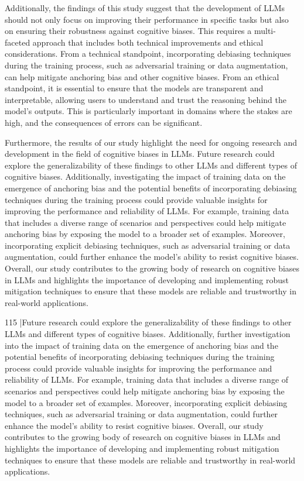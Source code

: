 \documentclass{article}
\begin{document}
Additionally, the findings of this study suggest that the development of LLMs should not only focus on improving their performance in specific tasks but also on ensuring their robustness against cognitive biases. This requires a multi-faceted approach that includes both technical improvements and ethical considerations. From a technical standpoint, incorporating debiasing techniques during the training process, such as adversarial training or data augmentation, can help mitigate anchoring bias and other cognitive biases. From an ethical standpoint, it is essential to ensure that the models are transparent and interpretable, allowing users to understand and trust the reasoning behind the model's outputs. This is particularly important in domains where the stakes are high, and the consequences of errors can be significant.

Furthermore, the results of our study highlight the need for ongoing research and development in the field of cognitive biases in LLMs. Future research could explore the generalizability of these findings to other LLMs and different types of cognitive biases. Additionally, investigating the impact of training data on the emergence of anchoring bias and the potential benefits of incorporating debiasing techniques during the training process could provide valuable insights for improving the performance and reliability of LLMs. For example, training data that includes a diverse range of scenarios and perspectives could help mitigate anchoring bias by exposing the model to a broader set of examples. Moreover, incorporating explicit debiasing techniques, such as adversarial training or data augmentation, could further enhance the model's ability to resist cognitive biases. Overall, our study contributes to the growing body of research on cognitive biases in LLMs and highlights the importance of developing and implementing robust mitigation techniques to ensure that these models are reliable and trustworthy in real-world applications.

115 |Future research could explore the generalizability of these findings to other LLMs and different types of cognitive biases. Additionally, further investigation into the impact of training data on the emergence of anchoring bias and the potential benefits of incorporating debiasing techniques during the training process could provide valuable insights for improving the performance and reliability of LLMs. For example, training data that includes a diverse range of scenarios and perspectives could help mitigate anchoring bias by exposing the model to a broader set of examples. Moreover, incorporating explicit debiasing techniques, such as adversarial training or data augmentation, could further enhance the model's ability to resist cognitive biases. Overall, our study contributes to the growing body of research on cognitive biases in LLMs and highlights the importance of developing and implementing robust mitigation techniques to ensure that these models are reliable and trustworthy in real-world applications.
\end{document}
